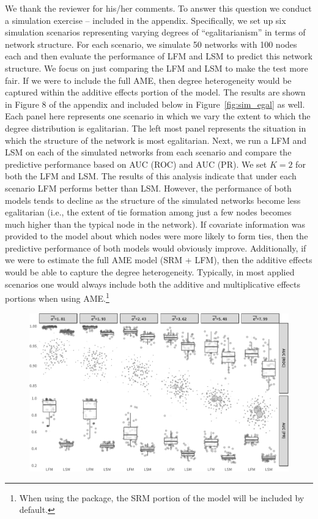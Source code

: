\begin{enumerate}
\begin{itemize}
\begin{itemize}
{{				We thank the reviewer for his/her comments. To answer this question we conduct a simulation exercise -- included in the appendix. Specifically, we set up six simulation scenarios representing varying degrees of ``egalitarianism'' in terms of network structure. For each scenario, we simulate 50 networks with 100 nodes each and then evaluate the performance of LFM and LSM to predict this network structure. We focus on just comparing the LFM and LSM to make the test more fair. If we were to include the full AME, then degree heterogeneity would be captured within the additive effects portion of the model. The results are shown in Figure 8 of the appendix and included below in Figure~\ref{fig:sim_egal} as well. Each panel here represents one scenario in which we vary the extent to which the degree distribution is egalitarian. The left most panel represents the situation in which the structure of the network is most egalitarian. Next, we run a LFM and LSM on each of the simulated networks from each scenario and compare the predictive performance based on AUC (ROC) and AUC (PR). We set $K=2$ for both the LFM and LSM. The results of this analysis indicate that under each scenario LFM performs better than LSM. However, the performance of both models tends to decline as the structure of the simulated networks become less egalitarian (i.e., the extent of tie formation among just a few nodes becomes much higher than the typical node in the network). If covariate information was provided to the model about which nodes were more likely to form ties, then the predictive performance of both models would obviously improve. Additionally, if we were to estimate the full AME model (SRM + LFM), then the additive effects would be able to capture the degree heterogeneity. Typically, in most applied scenarios one would always include both the additive and multiplicative effects portions when using AME.\footnote{When using the  package, the SRM portion of the model will be included by default.}  
				}}
			\end{itemize}	
			\begin{figure}[ht]
				\centering
				\includegraphics[width=1\textwidth]{sim1Viz_nets.pdf}

\end{figure}
\end{itemize}
\end{enumerate}
